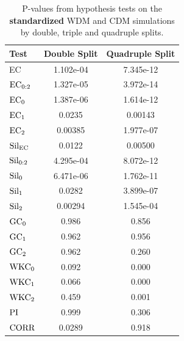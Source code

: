 \documentclass[12pt]{article}
\begin{document}
\begin{table}[htp!]
  \begin{center}
      \begin{tabular}{ l | c |  c }
            Test & Double Split & Quadruple Split \\
            \hline
            EC & 1.102e-04 &  7.345e-12 \\
            $\textup{EC}_{0:2}$ & 1.327e-05 &  3.972e-14 \\
            $\textup{EC}_{0}$ & 1.387e-06 & 1.614e-12 \\
            $\textup{EC}_{1}$ & 0.0235 & 0.00143 \\
            $\textup{EC}_{2}$ & 0.00385 & 1.977e-07 \\
            \hline
            $\textup{Sil}_{\textup{EC}}$ & 0.0122 & 0.00500 \\ 
            $\textup{Sil}_{0:2}$ & 4.295e-04 & 8.072e-12 \\
            $\textup{Sil}_{0}$ & 6.471e-06 & 1.762e-11 \\
            $\textup{Sil}_{1}$ & 0.0282 & 3.899e-07 \\
            $\textup{Sil}_{2}$ & 0.00294 & 1.545e-04 \\
            \hline
            $\textup{GC}_{0}$ & 0.986 & 0.856 \\
            $\textup{GC}_{1}$ & 0.962 & 0.956 \\
            $\textup{GC}_{2}$ & 0.962 & 0.260 \\
            \hline
            $\textup{WKC}_{0}$ & 0.092 & 0.000 \\
            $\textup{WKC}_{1}$ & 0.066 & 0.000 \\
            $\textup{WKC}_{2}$ & 0.459 & 0.001 \\
            $\textup{PI}$ & 0.999 & 0.306 \\
            \hline
            $\textup{CORR}$ & 0.0289 & 0.918 \\
        \end{tabular}
    \end{center}
\caption{P-values from hypothesis tests on the \textbf{standardized} WDM and CDM simulations by double, triple and quadruple splits.}
\label{table:normhypoCDMWDMresults}
\end{table}
\end{document}
